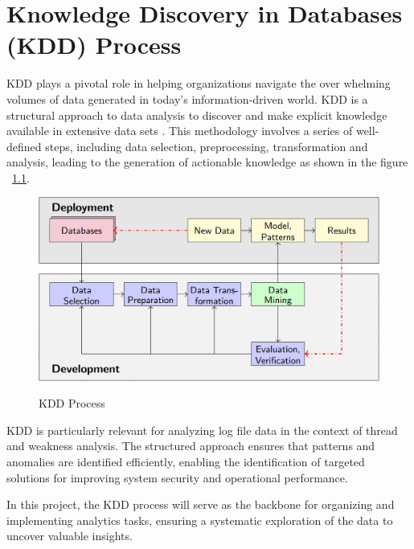 %
%

\chapter{Knowledge Discovery in Databases (KDD) Process}

KDD plays a pivotal role in helping organizations navigate the over whelming volumes of data generated in today’s information-driven world. KDD is a structural approach to data analysis to discover and make explicit knowledge available in extensive data sets \cite{Wings:2024}. This methodology involves a series of well-defined steps, including data selection, preprocessing, transformation and analysis, leading to the generation of actionable knowledge as shown in the figure ~\ref{KDD Process}. \cite{KDD:2000}

\begin{figure}
	\begin{center}
		\includegraphics[width=0.7\linewidth]{Images/KDD.png}
		\caption{KDD Process}
		\label{KDD Process} 
		\cite{Wings:2024}
	\end{center}
\end{figure}

KDD is particularly relevant for analyzing log file data in the context of thread and weakness analysis. The structured approach ensures that patterns and anomalies are identified efficiently, enabling the identification of targeted solutions for improving system security and operational performance.

In this project, the KDD process will serve as the backbone for organizing and implementing analytics tasks, ensuring a systematic exploration of the data to uncover valuable insights.

